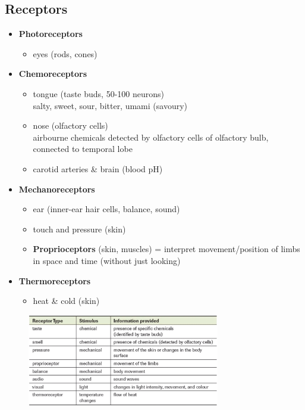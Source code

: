 \documentclass[a4paper,12pt]{article}
\begin{document}
\subsection{Receptors}
\begin{itemize}
    \item{
            \textbf{Photoreceptors}
            \begin{itemize}
                \item{eyes (rods, cones)}
            \end{itemize}
        }
    \item{
            \textbf{Chemoreceptors}
            \begin{itemize}
                \item{tongue (taste buds, 50-100 neurons) \\ salty, sweet, sour, bitter, umami (savoury)}
                \item{nose (olfactory cells) \\ airbourne chemicals detected by olfactory cells of olfactory bulb, connected to temporal lobe}
                \item{carotid arteries \& brain (blood pH)}
            \end{itemize}
        }
    \item{
            \textbf{Mechanoreceptors}
            \begin{itemize}
                \item{ear (inner-ear hair cells, balance, sound)}
                \item{touch and pressure (skin)}
                \item{\textbf{Proprioceptors} (skin, muscles) = interpret movement/position of limbs in space and time (without just looking)}
            \end{itemize}
        }
    \item{
            \textbf{Thermoreceptors}
            \begin{itemize}
                \item{heat \& cold (skin)}
            \end{itemize}
        }
\end{itemize}

\begin{figure}[H]
    \centering
    \includegraphics[width=0.75\textwidth]{sense-summary}
\end{figure}
\end{document}
